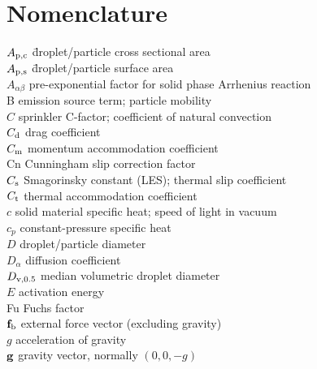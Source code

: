 

\chapter{Nomenclature}
\label{nomenclature}

\begin{tabbing}
$A_{\rm p,c}$ \hspace{1in}\= droplet/particle cross sectional area \\
$A_{\rm p,s}$ \hspace{1in}\= droplet/particle surface area \\
$A_{\alpha\beta}$         \> pre-exponential factor for solid phase Arrhenius reaction \\
B                       \> emission source term; particle mobility \\
$C$                       \> sprinkler C-factor; coefficient of natural convection \\
$C_{\rm d}$               \> drag coefficient \\
$C_{\rm m}$               \> momentum accommodation coefficient \\
Cn                        \> Cunningham slip correction factor \\
$C_{\rm s}$               \> Smagorinsky constant (LES); thermal slip coefficient  \\
$C_{\rm t}$               \> thermal accommodation coefficient \\
$c$                       \> solid material specific heat; speed of light in vacuum \\
$c_p$                     \> constant-pressure specific heat \\
$D$                       \> droplet/particle diameter   \\
$D_{\alpha}$              \> diffusion coefficient \\
$D_{\rm v,0.5}$           \> median volumetric droplet diameter \\
$E$                       \> activation energy \\
Fu                        \> Fuchs factor \\
${\mathbf{f}}_{\rm b}$            \> external force vector (excluding gravity) \\
$g$                       \> acceleration of gravity \\
${\mathbf{g}}$                     \> gravity vector, normally $(0,0,-g)$ \\

\end{tabbing}
